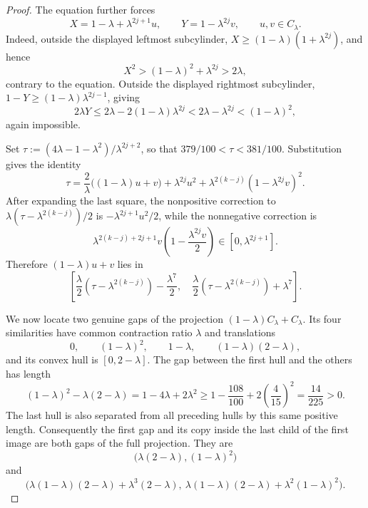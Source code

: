 \documentclass[11pt,a4paper]{amsart}
\numberwithin{equation}{section}
\theoremstyle{definition}
\begin{document}
\begin{proof}
The equation further forces
\[
X=1-\lambda+\lambda^{2j+1}u,\qquad
Y=1-\lambda^{2j}v,\qquad u,v\in C_\lambda.
\]
Indeed, outside the displayed leftmost subcylinder,
\(X\ge(1-\lambda)(1+\lambda^{2j})\), and hence
\[
X^2>(1-\lambda)^2+\lambda^{2j}>2\lambda,
\]
contrary to the equation. Outside the displayed rightmost
subcylinder, \(1-Y\ge(1-\lambda)\lambda^{2j-1}\), giving
\[
2\lambda Y\le2\lambda-2(1-\lambda)\lambda^{2j}
<2\lambda-\lambda^{2j}<(1-\lambda)^2,
\]
again impossible.

Set \(\tau:=(4\lambda-1-\lambda^2)/\lambda^{2j+2}\), so that
\(379/100<\tau<381/100\). Substitution gives the identity
\[
\tau=\frac2\lambda\bigl((1-\lambda)u+v\bigr)
       +\lambda^{2j}u^2
       +\lambda^{2(k-j)}(1-\lambda^{2j}v)^2.
\]
After expanding the last square, the nonpositive correction to
\(\lambda(\tau-\lambda^{2(k-j)})/2\) is
\(-\lambda^{2j+1}u^2/2\), while the nonnegative correction is
\[
\lambda^{2(k-j)+2j+1}v
       \left(1-\frac{\lambda^{2j}v}{2}\right)
\in[0,\lambda^{2j+1}].
\]
Therefore \((1-\lambda)u+v\) lies in
\[
\left[
\frac\lambda2(\tau-\lambda^{2(k-j)})-\frac{\lambda^7}{2},
\quad
\frac\lambda2(\tau-\lambda^{2(k-j)})+\lambda^7
\right].
\]

We now locate two genuine gaps of the projection
\((1-\lambda)C_\lambda+C_\lambda\). Its four similarities have
common contraction ratio \(\lambda\) and translations
\[
0,\qquad (1-\lambda)^2,\qquad 1-\lambda,\qquad
(1-\lambda)(2-\lambda),
\]
and its convex hull is \([0,2-\lambda]\). The gap between the first
hull and the others has length
\[
(1-\lambda)^2-\lambda(2-\lambda)
=1-4\lambda+2\lambda^2
\ge1-\frac{108}{100}+2\left(\frac4{15}\right)^2
=\frac{14}{225}>0.
\]
The last hull is also separated from all preceding hulls by this same
positive length. Consequently the first gap and its copy inside the
last child of the first image are both gaps of the full projection.
They are
\[
\bigl(\lambda(2-\lambda),(1-\lambda)^2\bigr)
\]
and
\[
\bigl(\lambda(1-\lambda)(2-\lambda)+\lambda^3(2-\lambda),
\ \lambda(1-\lambda)(2-\lambda)+\lambda^2(1-\lambda)^2\bigr).
\]


\end{proof}
\end{document}
